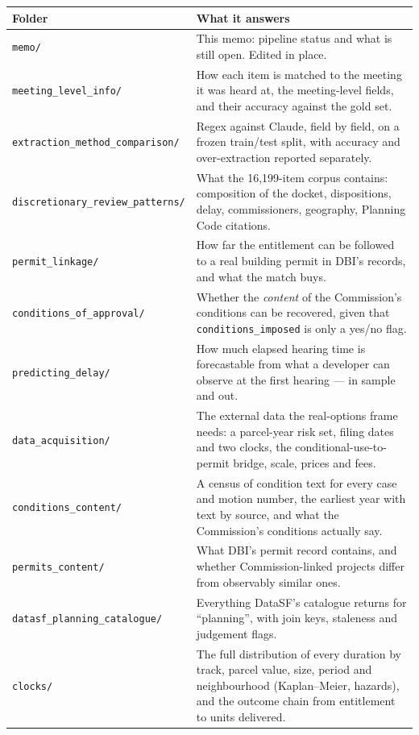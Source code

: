 \documentclass[11pt]{article}
\begin{document}
\begin{longtable}{p{}p{}}
\toprule
Folder & What it answers \\
\midrule
\endhead
\texttt{memo/} & This memo: pipeline status and what is still open. Edited in place. \\
\texttt{meeting\_level\_info/} & How each item is matched to the meeting it was heard at, the
meeting-level fields, and their accuracy against the gold set. \\
\texttt{extraction\_method\_comparison/} & Regex against Claude, field by field, on a frozen
train/test split, with accuracy and over-extraction reported separately. \\
\texttt{discretionary\_review\_patterns/} & What the 16{,}199-item corpus contains:
composition of the docket, dispositions, delay, commissioners, geography, Planning Code
citations. \\
\texttt{permit\_linkage/} & How far the entitlement can be followed to a real building permit
in DBI's records, and what the match buys. \\
\texttt{conditions\_of\_approval/} & Whether the \emph{content} of the Commission's conditions
can be recovered, given that \texttt{conditions\_imposed} is only a yes/no flag. \\
\texttt{predicting\_delay/} & How much elapsed hearing time is forecastable from what a
developer can observe at the first hearing --- in sample and out. \\
\texttt{data\_acquisition/} & The external data the real-options frame needs: a parcel-year
risk set, filing dates and two clocks, the conditional-use-to-permit bridge, scale, prices and
fees. \\
\texttt{conditions\_content/} & A census of condition text for every case and motion number,
the earliest year with text by source, and what the Commission's conditions actually say. \\
\texttt{permits\_content/} & What DBI's permit record contains, and whether Commission-linked
projects differ from observably similar ones. \\
\texttt{datasf\_planning\_catalogue/} & Everything DataSF's catalogue returns for
``planning'', with join keys, staleness and judgement flags. \\
\texttt{clocks/} & The full distribution of every duration by track, parcel value, size,
period and neighbourhood (Kaplan--Meier, hazards), and the outcome chain from entitlement to
units delivered. \\

\end{longtable}
\end{document}
